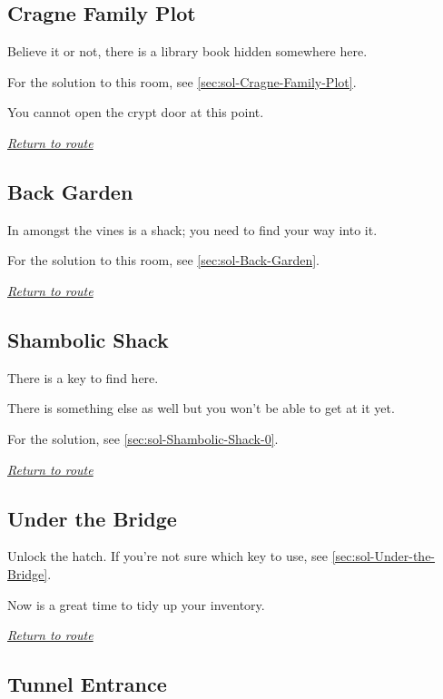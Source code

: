 \documentclass[a5paper]{extarticle}
\begin{document}
\newpage
\subsection{Cragne Family Plot}\label{sec:req-Cragne-Family-Plot}

Believe it or not, there is a library book hidden somewhere here.

For the solution to this room, see \cref{sec:sol-Cragne-Family-Plot}.

You cannot open the crypt door at this point.

\hyperref[sec:route-3]{\emph{Return to route}}

\newpage
\subsection{Back Garden}\label{sec:req-Back-Garden}

In amongst the vines is a shack; you need to find your way into it.

For the solution to this room, see \cref{sec:sol-Back-Garden}.

\hyperref[sec:route-3]{\emph{Return to route}}

\newpage
\subsection{Shambolic Shack}\label{sec:req-Shambolic-Shack-0}

There is a key to find here.

There is something else as well but you won't be able to get at it yet.

For the solution, see \cref{sec:sol-Shambolic-Shack-0}.

\hyperref[sec:route-3]{\emph{Return to route}}

\newpage
\subsection{Under the Bridge}\label{sec:req-Under-the-Bridge}

Unlock the hatch.
If you're not sure which key to use, see \cref{sec:sol-Under-the-Bridge}.

Now is a great time to tidy up your inventory.

\hyperref[sec:route-4]{\emph{Return to route}}

\newpage
\subsection{Tunnel Entrance}\label{sec:req-Tunnel-Entrance}
\end{document}
